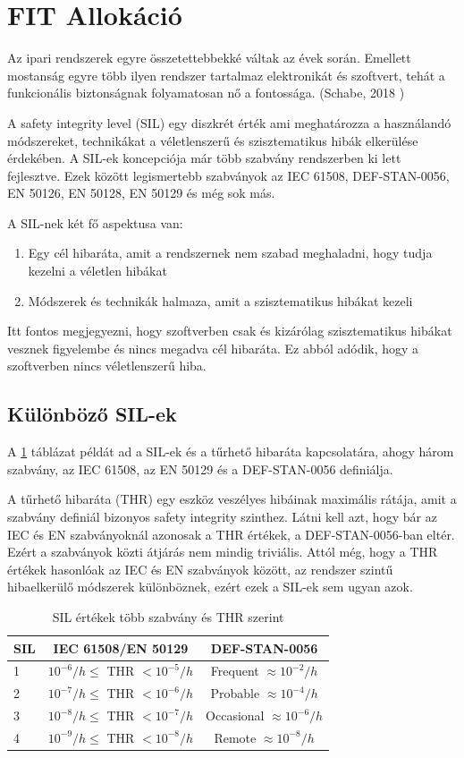 \section{FIT Allokáció} \label{sec:fit_allocation}
Az ipari rendszerek egyre összetettebbekké váltak az évek során. 
Emellett mostanság egyre több ilyen rendszer tartalmaz elektronikát és szoftvert, 
tehát a funkcionális biztonságnak folyamatosan nő a fontossága. (Schabe, 2018 \cite{Schabe})

A safety integrity level (SIL) egy diszkrét érték ami meghatározza a használandó módszereket, technikákat a véletlenszerű és szisztematikus hibák elkerülése érdekében.
A SIL-ek koncepciója már több szabvány rendszerben ki lett fejlesztve.
Ezek között legismertebb szabványok az IEC 61508, DEF-STAN-0056, EN 50126, EN 50128, EN 50129 és még sok más.

A SIL-nek két fő aspektusa van:
\begin{enumerate}
    \item Egy cél hibaráta, amit a rendszernek nem szabad meghaladni, hogy tudja kezelni a véletlen hibákat
    \item Módszerek és technikák halmaza, amit a szisztematikus hibákat kezeli 
\end{enumerate}

Itt fontos megjegyezni, hogy szoftverben csak és kizárólag szisztematikus hibákat vesznek figyelembe és nincs megadva cél hibaráta. Ez abból adódik, hogy a szoftverben nincs véletlenszerű hiba.

\subsection{Különböző SIL-ek}
A \ref{tab:SILs} táblázat példát ad a SIL-ek és a tűrhető hibaráta kapcsolatára, ahogy három szabvány, az IEC 61508, az EN 50129 és a DEF-STAN-0056 definiálja.

A tűrhető hibaráta (THR) egy eszköz veszélyes hibáinak maximális rátája, amit a szabvány definiál bizonyos safety integrity szinthez.
Látni kell azt, hogy bár az IEC és EN szabványoknál azonosak a THR értékek, a DEF-STAN-0056-ban eltér.
Ezért a szabványok közti átjárás nem mindig triviális.
Attól még, hogy a THR értékek hasonlóak az IEC és EN szabványok között, az rendszer szintű hibaelkerülő módszerek különböznek, ezért ezek a SIL-ek sem ugyan azok.
\begin{table}[ht]
	\footnotesize
	\centering
	\begin{tabular}{ l c c }
		\toprule
		SIL & IEC 61508/EN 50129 & DEF-STAN-0056 \\
		\midrule
		1 & \(10^{-6}/h \leq\) THR \(< 10^{-5}/h\) & Frequent \(\approx 10^{-2}/h\)\\
		2 & \(10^{-7}/h \leq\) THR \(< 10^{-6}/h\)  & Probable \(\approx 10^{-4}/h\)\\
		3 & \(10^{-8}/h \leq\) THR \(< 10^{-7}/h\)  & Occasional \(\approx 10^{-6}/h\)\\
		4 & \(10^{-9}/h \leq\) THR \(< 10^{-8}/h\)  & Remote \(\approx 10^{-8}/h\) \\
		\bottomrule
	\end{tabular}
	\caption{SIL értékek több szabvány és THR szerint}
	\label{tab:SILs}
\end{table}

